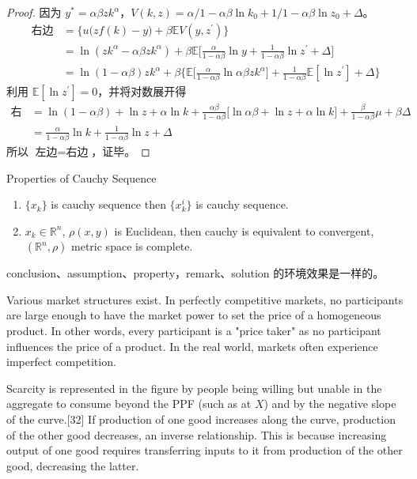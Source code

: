 \documentclass{elegantbook}
\begin{document}
\begin{proof}
因为 $y^*=\alpha\beta z k^\alpha$，$V(k,z)=\alpha/1-\alpha\beta\ln k_0+1/1-\alpha\beta \ln z_0+\Delta$。
   \begin{align*}
   \text{右边}&=\Big\{u\big(zf(k)-y\big)+\beta \mathbb{E}V(y,z^\prime)\Big\}\\
   &=\ln(zk^\alpha-\alpha\beta zk^\alpha)+\beta\mathbb{E}\Big[\frac{\alpha}{1-\alpha\beta}\ln y+\frac{1}{1-\alpha\beta}\ln z^\prime+\Delta\Big]\\
   &=\ln(1-\alpha\beta)zk^\alpha+\beta\Big\{\mathbb{E}\big[\frac{\alpha}{1-\alpha\beta}\ln \alpha\beta z k^\alpha\big]+\frac{1}{1-\alpha\beta}\mathbb{E}[\ln z^\prime]+\Delta\Big\}
   \end{align*}
利用 $\mathbb{E}[\ln z^\prime]=0$，并将对数展开得
   \begin{align*}
   \text{右边}&=\ln (1-\alpha\beta)+\ln z+\alpha\ln k+\frac{\alpha\beta}{1-\alpha\beta}\big[\ln \alpha\beta+\ln z+\alpha\ln k\big]+\frac{\beta}{1-\alpha\beta}\mu+\beta \Delta\\
   &=\frac{\alpha}{1-\alpha\beta}\ln k+\frac{1}{1-\alpha\beta}\ln z+\Delta
   \end{align*}
所以 $\text{左边}=\text{右边}$，证毕。
\end{proof}



\begin{property}
Properties of Cauchy Sequence
\begin{enumerate}[noitemsep]
\item $\{x_k\}$ is cauchy sequence then $\{x_k^i\}$ is cauchy sequence.
\item $x_k\in \mathbb{R}^n$, $\rho(x,y)$ is Euclidean, then cauchy is equivalent to convergent, $(\mathbb{R}^n,\rho)$ metric space is complete.
\end{enumerate}
\end{property}

\begin{note}
conclusion、assumption、property，remark、solution 的环境效果是一样的。
\end{note}

Various market structures exist. In perfectly competitive markets, no participants are large enough to have the market power to set the price of a homogeneous product. In other words, every participant is a "price taker" as no participant influences the price of a product. In the real world, markets often experience imperfect competition.

Scarcity is represented in the figure by people being willing but unable in the aggregate to consume beyond the PPF (such as at $X$) and by the negative slope of the curve.[32] If production of one good increases along the curve, production of the other good decreases, an inverse relationship. This is because increasing output of one good requires transferring inputs to it from production of the other good, decreasing the latter.
\end{document}
